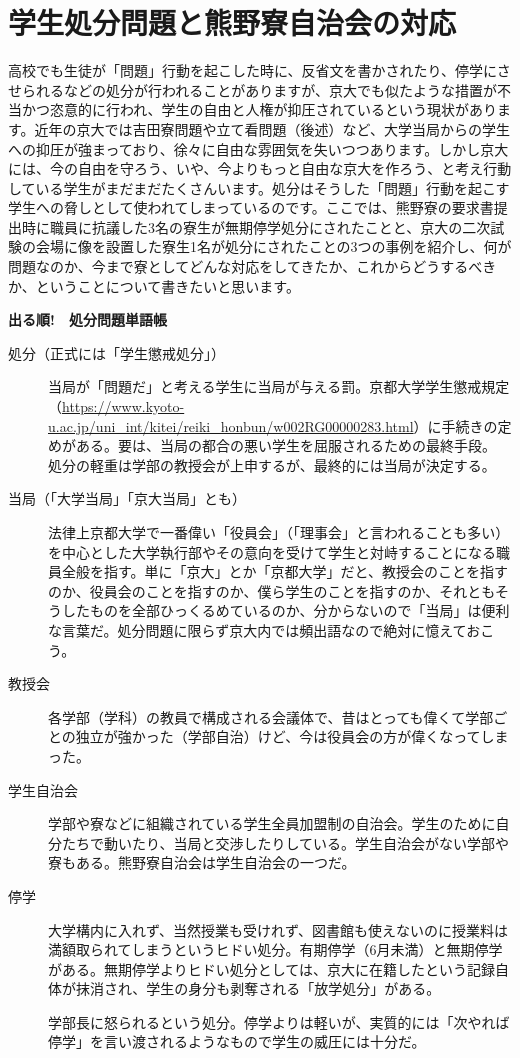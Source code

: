 
\section{学生処分問題と熊野寮自治会の対応}
\label{sec:shobun}


高校でも生徒が「問題」行動を起こした時に、反省文を書かされたり、停学にさせられるなどの処分が行われることがありますが、京大でも似たような措置が不当かつ恣意的に行われ、学生の自由と人権が抑圧されているという現状があります。近年の京大では吉田寮問題や立て看問題（後述）など、大学当局からの学生への抑圧が強まっており、徐々に自由な雰囲気を失いつつあります。しかし京大には、今の自由を守ろう、いや、今よりもっと自由な京大を作ろう、と考え行動している学生がまだまだたくさんいます。処分はそうした「問題」行動を起こす学生への脅しとして使われてしまっているのです。ここでは、熊野寮の要求書提出時に職員に抗議した3名の寮生が無期停学処分にされたことと、京大の二次試験の会場に像を設置した寮生1名が処分にされたことの3つの事例を紹介し、何が問題なのか、今まで寮としてどんな対応をしてきたか、これからどうするべきか、ということについて書きたいと思います。

\begin{shadebox}
{\large\textbf{出る順!　処分問題単語帳}}
\begin{description}
    \item[処分（正式には「学生懲戒処分」）] 当局が「問題だ」と考える学生に当局が与える罰。京都大学学生懲戒規定（\url{https://www.kyoto-u.ac.jp/uni_int/kitei/reiki_honbun/w002RG00000283.html}）に手続きの定めがある。要は、当局の都合の悪い学生を屈服されるための最終手段。 処分の軽重は学部の教授会が上申するが、最終的には当局が決定する。
    \item[当局（「大学当局」「京大当局」とも）] 法律上京都大学で一番偉い「役員会」（「理事会」と言われることも多い）を中心とした大学執行部やその意向を受けて学生と対峙することになる職員全般を指す。単に「京大」とか「京都大学」だと、教授会のことを指すのか、役員会のことを指すのか、僕ら学生のことを指すのか、それともそうしたものを全部ひっくるめているのか、分からないので「当局」は便利な言葉だ。処分問題に限らず京大内では頻出語なので絶対に憶えておこう。
    \item[教授会] 	各学部（学科）の教員で構成される会議体で、昔はとっても偉くて学部ごとの独立が強かった（学部自治）けど、今は役員会の方が偉くなってしまった。
    \item[学生自治会] 学部や寮などに組織されている学生全員加盟制の自治会。学生のために自分たちで動いたり、当局と交渉したりしている。学生自治会がない学部や寮もある。熊野寮自治会は学生自治会の一つだ。
    \item[停学] 大学構内に入れず、当然授業も受けれず、図書館も使えないのに授業料は満額取られてしまうというヒドい処分。有期停学（6月未満）と無期停学がある。無期停学よりヒドい処分としては、京大に在籍したという記録自体が抹消され、学生の身分も剥奪される「放学処分」がある。
    \item[] 学部長に怒られるという処分。停学よりは軽いが、実質的には「次やれば停学」を言い渡されるようなもので学生の威圧には十分だ。
\end{description}
\end{shadebox}



